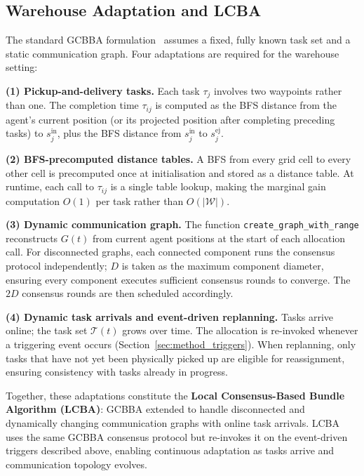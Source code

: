 \subsection{Warehouse Adaptation and LCBA}
\label{subsec:method_warehouse_adaptation}

The standard GCBBA formulation~\cite{kha2025enhancing} assumes a fixed, fully
known task set and a static communication graph.
Four adaptations are required for the warehouse setting:

\textbf{(1) Pickup-and-delivery tasks.}
Each task $\tau_j$ involves two waypoints rather than one.
The completion time $\tau_{ij}$ is computed as the BFS distance from the
agent's current position (or its projected position after completing preceding
tasks) to $s_j^{\text{in}}$, plus the BFS distance from $s_j^{\text{in}}$ to
$s_j^{\text{ej}}$.

\textbf{(2) BFS-precomputed distance tables.}
A BFS from every grid cell to every other cell is precomputed once at
initialisation and stored as a distance table.
At runtime, each call to $\tau_{ij}$ is a single table lookup, making the
marginal gain computation $O(1)$ per task rather than $O(|\mathcal{W}|)$.

\textbf{(3) Dynamic communication graph.}
The function \texttt{create\_graph\_with\_range} reconstructs $G(t)$ from
current agent positions at the start of each allocation call.
For disconnected graphs, each connected component runs the consensus protocol
independently; $D$ is taken as the maximum component diameter, ensuring every
component executes sufficient consensus rounds to converge.
The $2D$ consensus rounds are then scheduled accordingly.

\textbf{(4) Dynamic task arrivals and event-driven replanning.}
Tasks arrive online; the task set $\mathcal{T}(t)$ grows over time.
The allocation is re-invoked whenever a triggering event occurs
(Section~\ref{sec:method_triggers}).
When replanning, only tasks that have not yet been physically picked up are
eligible for reassignment, ensuring consistency with tasks already in progress.

Together, these adaptations constitute the \textbf{Local Consensus-Based Bundle
Algorithm (LCBA)}: GCBBA extended to handle disconnected and dynamically
changing communication graphs with online task arrivals.
LCBA uses the same GCBBA consensus protocol but re-invokes it on the
event-driven triggers described above, enabling continuous adaptation as tasks
arrive and communication topology evolves.


